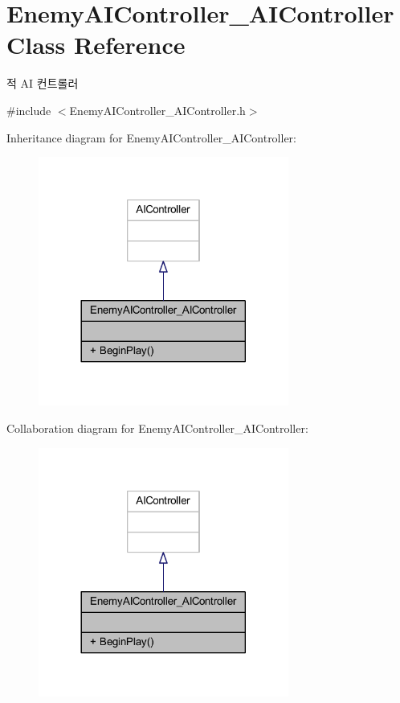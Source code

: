 \hypertarget{class_enemy_a_i_controller___a_i_controller}{}\section{Enemy\+A\+I\+Controller\+\_\+\+A\+I\+Controller Class Reference}
\label{class_enemy_a_i_controller___a_i_controller}


적 AI 컨트롤러  




{\ttfamily \#include $<$Enemy\+A\+I\+Controller\+\_\+\+A\+I\+Controller.\+h$>$}



Inheritance diagram for Enemy\+A\+I\+Controller\+\_\+\+A\+I\+Controller\+:\nopagebreak
\begin{figure}[H]
\begin{center}
\leavevmode
\includegraphics[width=233pt]{class_enemy_a_i_controller___a_i_controller__inherit__graph}
\end{center}
\end{figure}


Collaboration diagram for Enemy\+A\+I\+Controller\+\_\+\+A\+I\+Controller\+:\nopagebreak
\begin{figure}[H]
\begin{center}
\leavevmode
\includegraphics[width=233pt]{class_enemy_a_i_controller___a_i_controller__coll__graph}
\end{center}
\end{figure}
